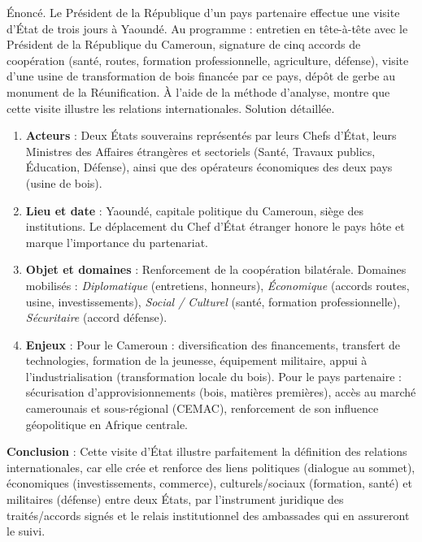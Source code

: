 \documentclass[11pt]{article}
\newcommand{\cle}[1]{{\popxbold\color{popdark}#1}}
\begin{document}
\begin{exoresolu}
Énoncé. Le Président de la République d'un pays partenaire effectue une visite d'État de trois jours à Yaoundé. Au programme : entretien en tête-à-tête avec le Président de la République du Cameroun, signature de cinq accords de coopération (santé, routes, formation professionnelle, agriculture, défense), visite d'une usine de transformation de bois financée par ce pays, dépôt de gerbe au monument de la Réunification. À l'aide de la méthode d'analyse, montre que cette visite illustre les relations internationales.
\tcblower
Solution détaillée.
\begin{enumerate}
\item \textbf{Acteurs} : Deux États souverains représentés par leurs Chefs d'État, leurs Ministres des Affaires étrangères et sectoriels (Santé, Travaux publics, Éducation, Défense), ainsi que des opérateurs économiques des deux pays (usine de bois).
\item \textbf{Lieu et date} : Yaoundé, capitale politique du Cameroun, siège des institutions. Le déplacement du Chef d'État étranger honore le pays hôte et marque l'importance du partenariat.
\item \textbf{Objet et domaines} : Renforcement de la coopération bilatérale. Domaines mobilisés : \emph{Diplomatique} (entretiens, honneurs), \emph{Économique} (accords routes, usine, investissements), \emph{Social / Culturel} (santé, formation professionnelle), \emph{Sécuritaire} (accord défense).
\item \textbf{Enjeux} : Pour le Cameroun : diversification des financements, transfert de technologies, formation de la jeunesse, équipement militaire, appui à l'industrialisation (transformation locale du bois). Pour le pays partenaire : sécurisation d'approvisionnements (bois, matières premières), accès au marché camerounais et sous-régional (CEMAC), renforcement de son influence géopolitique en Afrique centrale.
\end{enumerate}
\textbf{Conclusion} : Cette visite d'État illustre parfaitement la définition des relations internationales, car elle crée et renforce des liens \cle{politiques} (dialogue au sommet), \cle{économiques} (investissements, commerce), \cle{culturels/sociaux} (formation, santé) et \cle{militaires} (défense) entre deux États, par l'instrument juridique des \cle{traités/accords} signés et le relais institutionnel des \cle{ambassades} qui en assureront le suivi.
\end{exoresolu}
\end{document}
